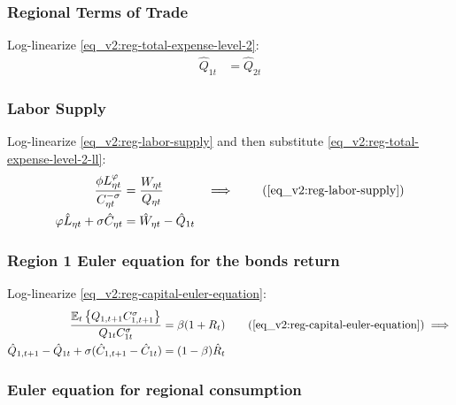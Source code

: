 \documentclass[../thesis.tex]{subfiles}
\begin{document}
\subsubsection*{Regional Terms of Trade}

Log-linearize \ref{eq_v2:reg-total-expense-level-2}:
\begin{align}
	\hat{Q}_{1t} &= \hat{Q}_{2t} \label{eq_v2:reg-total-expense-level-2-ll}
\end{align}


\subsubsection*{Labor Supply}

Log-linearize \ref{eq_v2:reg-labor-supply} and then substitute \ref{eq_v2:reg-total-expense-level-2-ll}:
\begin{alignat}{2}
	\frac{\phi L_{\eta t}^{\varphi}}{C_{\eta t}^{-\sigma}} &= \frac{W_{\eta t}}{Q_{\eta t}} &\implies \tag{\ref{eq_v2:reg-labor-supply}} \\
	\varphi \hat{L}_{\eta t} + \sigma \hat{C}_{\eta t} &= \hat{W}_{\eta t} - \hat{Q}_{1t} & \label{eq_v2:reg-ll-labor-supply}
\end{alignat}


\subsubsection*{Region 1 Euler equation for the bonds return}

Log-linearize \ref{eq_v2:reg-capital-euler-equation}:
\begin{align}
	\frac{\mathbb{E}_{t} \left\{Q_{1, t+1} C_{1, t+1}^{\sigma} \right\}}{Q_{1t} C_{1t}^{\sigma}} &= \beta (1 + R_{t}) \tag{\ref{eq_v2:reg-capital-euler-equation}} \implies \\
	\hat{Q}_{1, t+1} - \hat{Q}_{1t} + \sigma (\hat{C}_{1, t+1} - \hat{C}_{1t}) &= (1 - \beta) \hat{R}_{t} \label{eq_v2:reg-bonds-euler-equation-ll}
\end{align}


\subsubsection*{Euler equation for regional consumption}
\end{document}
